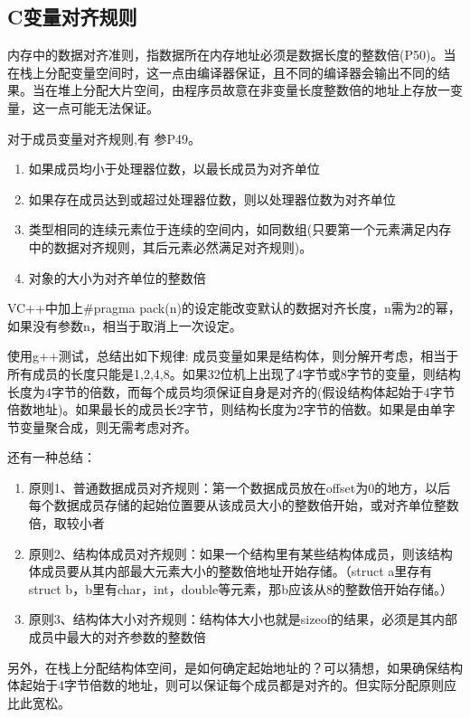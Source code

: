 \subsection{C变量对齐规则}
内存中的数据对齐准则，指数据所在内存地址必须是数据长度的整数倍(\cite{pibible}P50)。当在栈上分配变量空间时，这一点由编译器保证，且不同的编译器会输出不同的结果。当在堆上分配大片空间，由程序员故意在非变量长度整数倍的地址上存放一变量，这一点可能无法保证。

对于成员变量对齐规则,有
参\cite{pibible}P49。
\begin{enumerate}
    \item 如果成员均小于处理器位数，以最长成员为对齐单位
    \item 如果存在成员达到或超过处理器位数，则以处理器位数为对齐单位
    \item 类型相同的连续元素位于连续的空间内，如同数组(只要第一个元素满足内存中的数据对齐规则，其后元素必然满足对齐规则)。
    \item 对象的大小为对齐单位的整数倍
\end{enumerate}

VC++中加上\#pragma pack(n)的设定能改变默认的数据对齐长度，n需为2的幂，如果没有参数n，相当于取消上一次设定。

使用g++测试，总结出如下规律:
    成员变量如果是结构体，则分解开考虑，相当于所有成员的长度只能是1,2,4,8。如果32位机上出现了4字节或8字节的变量，则结构长度为4字节的倍数，而每个成员均须保证自身是对齐的(假设结构体起始于4字节倍数地址)。如果最长的成员长2字节，则结构长度为2字节的倍数。如果是由单字节变量聚合成，则无需考虑对齐。

还有一种总结：
\begin{enumerate}
\item 原则1、普通数据成员对齐规则：第一个数据成员放在offset为0的地方，以后每个数据成员存储的起始位置要从该成员大小的整数倍开始，或对齐单位整数倍，取较小者
\item 原则2、结构体成员对齐规则：如果一个结构里有某些结构体成员，则该结构体成员要从其内部最大元素大小的整数倍地址开始存储。（struct a里存有struct b，b里有char，int，double等元素，那b应该从8的整数倍开始存储。）
\item 原则3、结构体大小对齐规则：结构体大小也就是sizeof的结果，必须是其内部成员中最大的对齐参数的整数倍
\end{enumerate}

另外，在栈上分配结构体空间，是如何确定起始地址的？可以猜想，如果确保结构体起始于4字节倍数的地址，则可以保证每个成员都是对齐的。但实际分配原则应比此宽松。

